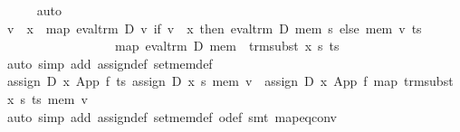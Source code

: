 \begin{isabellebody}
\ \ \ \ \isamarkupfalse%
\ auto\isanewline
\ \ \isamarkupfalse%
\ {}v\ {}\ x\ {}\ map\ {}eval{}trm\ D\ {}{}v{}\ if\ v\ {}\ x\ then\ eval{}trm\ D\ mem\ s\ else\ mem\ v{}{}\ ts\ {}\isanewline
\ \ \ \ \ \ \ \ \ \ \ \ \ \ \ \ \ \ map\ {}eval{}trm\ D\ mem\ {}\ trm{}subst\ x\ s{}\ ts{}\isanewline
\ \ \ \ \isamarkupfalse%
\ {}auto\ simp\ add{}\ assign{}def\ set{}mem{}def{}\isanewline
\ \ \isamarkupfalse%
\ {}assign\ D\ x\ {}App\ f\ ts{}\ {}assign\ D\ x\ s\ mem{}\ v\ {}\ assign\ D\ x\ {}App\ f\ {}map\ {}trm{}subst\ x\ s{}\ ts{}{}\ mem\ v{}\isanewline
\ \ \ \ \isamarkupfalse%
\ {}auto\ simp\ add{}\ assign{}def\ set{}mem{}def\ o{}def{}\ smt\ map{}eq{}conv{}\isanewline
{}\isamarkupfalse%
%
\endisatagproof
{\isafoldproof}%
%
\isadelimproof
\isanewline
%
\endisadelimproof

\end{isabellebody}
